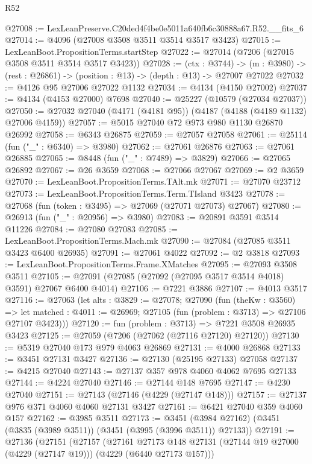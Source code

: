 \begin{lexlean}{R52}
\begin{coremodule}
@27008 := LexLeanPreserve.C20ded4f4be0e5011a640fb6c30888a67.R52.__fits_6
@27014 := @4096 (@27008 @3508 @3511 @3514 @3517 @3423)
@27015 := LexLeanBoot.PropositionTerms.startStep
@27022 := @27014 (@7206 (@27015 @3508 @3511 @3514 @3517 @3423))
@27028 := (ctx : @3744) ->
  (m : @3980) -> (rest : @26861) -> (position : @13) -> (depth : @13) -> @27007 @27022
@27032 := @4126 @95 @27006 @27022 @1132
@27034 := @4134 (@4150 @27002)
@27037 := @4134 (@4153 @27000) @7698
@27040 := @25227 (@10579 (@27034 @27037))
@27050 := @27032 @27040 (@4171 (@4181 @95)) (@4187 (@4188 (@4189 @1132) @27006 @4159))
@27057 := @5015 @27040 @72 @973 @980 @1130 @26870 @26992
@27058 := @6343 @26875
@27059 := @27057 @27058
@27061 := @25114 (fun ("_" : @6340) => @3980)
@27062 := @27061 @26876
@27063 := @27061 @26885
@27065 := @8448 (fun ("_" : @7489) => @3829)
@27066 := @27065 @26892
@27067 := @26 @3659
@27068 := @27066 @27067
@27069 := @2 @3659
@27070 := LexLeanBoot.PropositionTerms.TAlt.mk
@27071 := @27070 @23712
@27073 := LexLeanBoot.PropositionTerms.Term.TIsland @3423
@27078 := @27068 (fun (token : @3495) => @27069 (@27071 @27073) @27067)
@27080 := @26913 (fun ("_" : @20956) => @3980)
@27083 := @20891 @3591 @3514 @11226
@27084 := @27080 @27083
@27085 := LexLeanBoot.PropositionTerms.Mach.mk
@27090 := @27084 (@27085 @3511 @3423 @6400 @26935)
@27091 := @27061 @4022
@27092 := @2 @3818
@27093 := LexLeanBoot.PropositionTerms.Frame.XMatches
@27095 := @27093 @3508 @3511
@27105 := @27091 (@27085 (@27092 (@27095 @3517 @3514 @4018) @3591) @27067 @6400 @4014)
@27106 := @7221 @3886
@27107 := @4013 @3517
@27116 := @27063
    (let alts : @3829 := @27078;
    @27090
      (fun (theKw : @3560) =>
      let matched : @4011 := @26969; @27105 (fun (problem : @3713) => @27106 @27107 @3423)))
@27120 := fun (problem : @3713) => @7221 @3508 @26935 @3423
@27125 := @27059 (@7206 (@27062 (@27116 @27120) @27120))
@27130 := @5319 @27040 @173 @979 @4063 @26869
@27131 := @4000 @26868
@27133 := @3451 @27131 @3427
@27136 := @27130 (@25195 @27133) @27058
@27137 := @4215 @27040
@27143 := @27137 @357 @978 @4060 @4062 @7695 @27133
@27144 := @4224 @27040
@27146 := @27144 @148 @7695
@27147 := @4230 @27040
@27151 := @27143 (@27146 (@4229 (@27147 @148)))
@27157 := @27137 @976 @371 @4060 @4060 @27131 @3427
@27161 := @6421 @27040 @359 @4060 @157
@27162 := @3985 @3511
@27173 := @3451 (@3984 @27162) (@3451 (@3835 (@3989 @3511)) (@3451 (@3995 (@3996 @3511)) @27133))
@27191 := @27136
    (@27151
      (@27157
        (@27161
          @27173
          @148
          @27131
          (@27144 @19 @27000 (@4229 (@27147 @19)))
          (@4229 (@6440 @27173 @157)))

\end{coremodule}
\end{lexlean}
